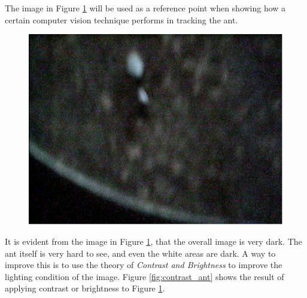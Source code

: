 The image in Figure \ref{fig:ant} will be used as a reference point when showing how a certain computer vision technique performs in tracking the ant.

\begin{figure}[ht!]
  \centering
    \includegraphics[scale=0.25]{img/ant.png}
  \caption{}
  \label{fig:ant}
\end{figure}

It is evident from the image in Figure \ref{fig:ant}, that the overall image is very dark. The ant itself is very hard to see, and even the white areas are dark. A way to improve this is to use the theory of \emph{Contrast and Brightness} to improve the lighting condition of the image. Figure \ref{fig:contrast_ant} shows the result of applying contrast or brightness to Figure \ref{fig:ant}. \\

